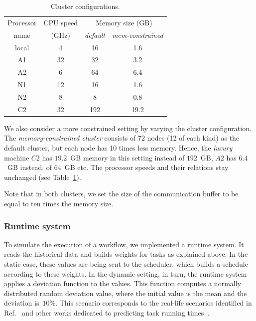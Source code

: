 \documentclass[conference]{IEEEtran}
\begin{document}
\begin{table}[b]
    \begin{center}
        \begin{tabular}{c|c|cc}
            \toprule
            Processor  %
            &  CPU speed   & \multicolumn{2}{c}{Memory size (GB)} \\
            name & (GHz) & {\em default} & {\em mem-constrained} \\
            \midrule
            local                    & 4                    & 16     & 1.6 \\
            A1                      & 32                   & 32     & 3.2 \\
            A2                      & 6                    & 64    & 6.4 \\
            N1                      & 12                   & 16     & 1.6 \\
            N2                      & 8                    & 8      & 0.8\\
            C2                      & 32                   & 192   &  19.2\\
            \bottomrule
        \end{tabular}
    \end{center}
    \caption{Cluster configurations.}
    \label{tab:procs}
\end{table}

We also consider a more constrained setting by varying the cluster configuration. 
The {\em memory-constrained cluster} consists of 72 nodes (12 of each kind) as the default cluster,
but each node has 10 times less memory. Hence,  
the {\em luxury} machine $C2$ has $19.2$~GB memory in this setting instead of $192$~GB, 
$A2$ has $6.4$~GB instead, of $64$~GB etc.
The processor speeds and their relations stay unchanged (see Table~\ref{tab:procs}).

Note that in both clusters, we set the size of the communication buffer to be equal
to ten times the memory size.


\subsubsection{Runtime system}
\label{ss:runtime-sys}
%
To simulate the execution of a workflow, we implemented a runtime system.
It reads the historical data and builds weights for tasks as explained above.
In the static case, these values are being sent to the scheduler, which builds a schedule
according to these weights.
In the dynamic setting, in turn, the runtime system applies a deviation function to the values.
This function computes a normally distributed random deviation value, where the initial value
is the mean and the deviation is~$10\%$.
This scenario corresponds to the real-life scenarios identified in Ref.~\cite{lotaru} and
other works dedicated to predicting task running times~\cite{da2015online,da2013toward}.
\end{document}
